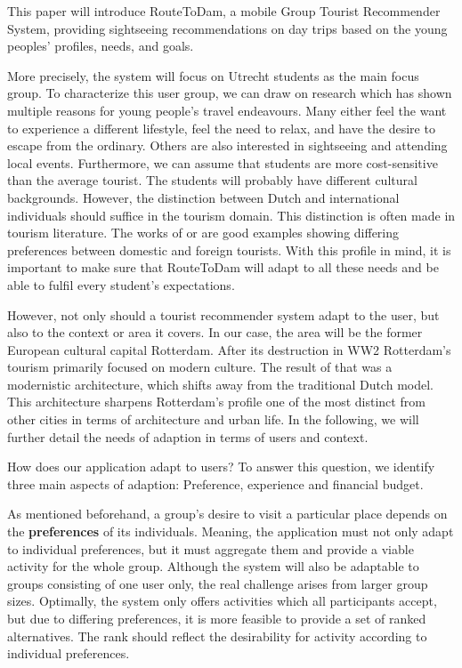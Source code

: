 \documentclass[11pt,a4paper,oneside]{article}
\begin{document}
This paper will introduce RouteToDam, a mobile Group Tourist Recommender System, providing sightseeing recommendations on day trips based on the young peoples' profiles, needs, and goals. 

More precisely, the system will focus on Utrecht students as the main focus group. To characterize this user group, we can draw on research which has shown multiple reasons for young people's travel endeavours.\cite{rita2019millennials} Many either feel the want to experience a different lifestyle, feel the need to relax, and have the desire to escape from the ordinary. Others are also interested in sightseeing and attending local events. Furthermore, we can assume that students are more cost-sensitive than the average tourist.\cite{europeantravelcommission_StudyGenerationTravellers_2020} The students will probably have different cultural backgrounds. However, the distinction between Dutch and international individuals should suffice in the tourism domain. This distinction is often made in tourism literature. The works of \citeauthor{maeda_ExtractionTouristDestinations_2018} or \citeauthor{stone_TouristGazeDomestic_2019} are good examples showing differing preferences between domestic and foreign tourists.\cite{maeda_ExtractionTouristDestinations_2018}\cite{stone_TouristGazeDomestic_2019} With this profile in mind, it is important to make sure that RouteToDam will adapt to all these needs and be able to fulfil every student's expectations.

However, not only should a tourist recommender system adapt to the user, but also to the context or area it covers. In our case, the area will be the former European cultural capital Rotterdam.\cite{hitters_SocialPoliticalConstruction_2000} After its destruction in WW2 Rotterdam's tourism primarily focused on modern culture.\cite{rotterdam} The result of that was a modernistic architecture, which shifts away from the traditional Dutch model. This architecture sharpens Rotterdam's profile one of the most distinct from other cities in terms of architecture and urban life. In the following, we will further detail the needs of adaption in terms of users and context.

How does our application adapt to users? To answer this question, we identify three main aspects of adaption: Preference, experience and financial budget. 

As mentioned beforehand, a group's desire to visit a particular place depends on the \textbf{preferences} of its individuals. Meaning, the application must not only adapt to individual preferences, but it must aggregate them and provide a viable activity for the whole group. Although the system will also be adaptable to groups consisting of one user only, the real challenge arises from larger group sizes. Optimally, the system only offers activities which all participants accept, but due to differing preferences, it is more feasible to provide a set of ranked alternatives. The rank should reflect the desirability for activity according to individual preferences. 
\end{document}
